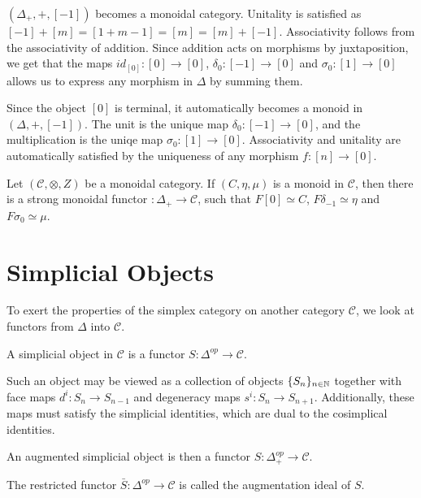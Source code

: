 \documentclass[../thesis.tex]{subfiles}
\begin{document}
        $(\Delta_+,+,[-1])$ becomes a monoidal category. Unitality is satisfied as $[-1]+[m] = [1+m-1] = [m] = [m] + [-1]$. Associativity follows from the associativity of addition. Since addition acts on morphisms by juxtaposition, we get that the maps $id_[0] : [0] \rightarrow [0]$, $\delta_0 : [-1] \rightarrow [0]$ and $\sigma_0 : [1] \rightarrow [0]$ allows us to express any morphism in $\Delta$ by summing them.

        Since the object $[0]$ is terminal, it automatically becomes a monoid in $(\Delta, +, [-1])$. The unit is the unique map $\delta_0 : [-1] \rightarrow [0]$, and the multiplication is the uniqe map $\sigma_0 : [1] \rightarrow [0]$. Associativity and unitality are automatically satisfied by the uniqueness of any morphism $f:[n]\rightarrow [0]$.
        \begin{proposition}\label{prop: universal-monoid}
            Let $(\mathcal{C}, \otimes, Z)$ be a monoidal category. If $(C, \eta, \mu)$ is a monoid in $\mathcal{C}$, then there is a strong monoidal functor $:\Delta_+\rightarrow \mathcal{C}$, such that $F[0] \simeq C$, $F\delta_{-1} \simeq \eta$ and $F\sigma_0 \simeq \mu$.
        \end{proposition}


    \section{Simplicial Objects}
        To exert the properties of the simplex category on another category $\mathcal{C}$, we look at functors from $\Delta$ into $\mathcal{C}$. 
        
        \begin{definition}
            A simplicial object in $\mathcal{C}$ is a functor $S:\Delta^{op}\rightarrow \mathcal{C}$. 
        \end{definition}
        Such an object may be viewed as a collection of objects $\{S_n\}_{n\in\mathbb{N}}$ together with face maps $d^i: S_n\rightarrow S_{n-1}$ and degeneracy maps $s^i: S_n \rightarrow S_{n+1}$. Additionally, these maps must satisfy the simplicial identities, which are dual to the cosimplical identities.
        
        \begin{definition}
            An augmented simplicial object is then a functor $S:\Delta_+^{op}\rightarrow \mathcal{C}$. 
            
            The restricted functor $\bar{S}:\Delta^{op}\rightarrow \mathcal{C}$ is called the augmentation ideal of $S$. 
        \end{definition}
\end{document}

